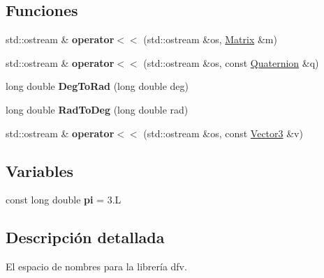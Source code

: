 \subsection*{\-Funciones}
\begin{DoxyCompactItemize}
\item 
\hypertarget{namespacedfv_ad8927f67ba8edddcac516b42526469cb}{std\-::ostream \& {\bfseries operator$<$$<$} (std\-::ostream \&os, \hyperlink{classdfv_1_1Matrix}{\-Matrix} \&m)}\label{namespacedfv_ad8927f67ba8edddcac516b42526469cb}

\item 
\hypertarget{namespacedfv_a34afb9ee3a4d367ed0ff26803a02e9a6}{std\-::ostream \& {\bfseries operator$<$$<$} (std\-::ostream \&os, const \hyperlink{classdfv_1_1Quaternion}{\-Quaternion} \&q)}\label{namespacedfv_a34afb9ee3a4d367ed0ff26803a02e9a6}

\item 
\hypertarget{namespacedfv_a728989b94aadab2a56a40bbcc93f2d06}{long double {\bfseries \-Deg\-To\-Rad} (long double deg)}\label{namespacedfv_a728989b94aadab2a56a40bbcc93f2d06}

\item 
\hypertarget{namespacedfv_a24f4e4cf53fd0ddfb8ac2359c34fbe4b}{long double {\bfseries \-Rad\-To\-Deg} (long double rad)}\label{namespacedfv_a24f4e4cf53fd0ddfb8ac2359c34fbe4b}

\item 
\hypertarget{namespacedfv_a1ba60f8078ec59cd17d8c8d34ee19240}{std\-::ostream \& {\bfseries operator$<$$<$} (std\-::ostream \&os, const \hyperlink{classdfv_1_1Vector3}{\-Vector3} \&v)}\label{namespacedfv_a1ba60f8078ec59cd17d8c8d34ee19240}

\end{DoxyCompactItemize}
\subsection*{\-Variables}
\begin{DoxyCompactItemize}
\item 
\hypertarget{namespacedfv_a71bc1ec662e3704a119726649b0b0f91}{const long double {\bfseries pi} = 3.\-L}\label{namespacedfv_a71bc1ec662e3704a119726649b0b0f91}

\end{DoxyCompactItemize}


\subsection{\-Descripción detallada}
\-El espacio de nombres para la librería dfv. 